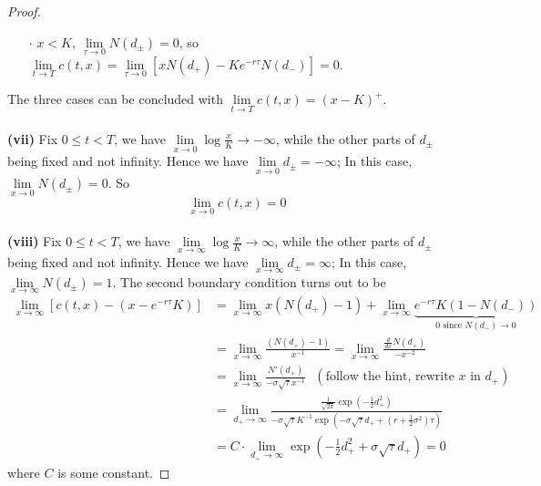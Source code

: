 \documentclass[a4paper, 10pt]{article}
\theoremstyle{definition}
\theoremstyle{hSol}
\begin{document}
\begin{proof}
\begin{itemize}
	\item[$\cdot$]  $x<K$, $\lim\limits_{\tau\rightarrow 0}N(d_{\pm}) = 0$, so $\lim\limits_{t\rightarrow T} c(t,x) = \lim\limits_{\tau \rightarrow 0} [xN(d_+)-Ke^{-r\tau}N(d_-)] =0$.
\end{itemize}
The three cases can be concluded with $\lim\limits_{t \rightarrow T} c(t,x) = (x-K)^+$.\\
~\\
\textbf{(vii)} Fix $0\leq t <T$, we have $\lim\limits_{x\rightarrow 0} \log \frac{x}{K}\to -\infty$, while the other parts of $d_{\pm}$ being fixed and not infinity. Hence we have $\lim\limits_{x\rightarrow 0} d_{\pm} = -\infty$; In this case, $\lim\limits_{x\rightarrow 0}N(d_{\pm})=0$. So
$$
\lim\limits_{x\rightarrow 0} c(t,x) = 0
$$
~\\
\textbf{(viii)} Fix $0\leq t <T$, we have $\lim\limits_{x\rightarrow \infty} \log \frac{x}{K}\to \infty$, while the other parts of $d_{\pm}$ being fixed and not infinity. Hence we have $\lim\limits_{x\rightarrow \infty} d_{\pm} = \infty$; In this case, $\lim\limits_{x\rightarrow \infty}N(d_{\pm})=1$. The second boundary condition turns out to be
\begin{equation}
	\begin{split}
		\lim\limits_{x\rightarrow\infty} [c(t,x) - (x-e^{-r\tau}K)] &= \lim\limits_{x\rightarrow\infty} x(N(d_+)-1) + \lim\limits_{x\rightarrow\infty} \underbrace{e^{-r\tau}K(1-N(d_-))}_{\text{0 since } N(d_-)\to 0} \\
		&=\lim\limits_{x\rightarrow\infty} \frac{(N(d_+)-1)}{x^{-1}} =\lim\limits_{x\rightarrow\infty} \frac{\frac{d}{d x} N(d_+)}{ -x^{-2}} \\
		&= \lim\limits_{x\rightarrow\infty} \frac{N'(d_+)}{ -\sigma \sqrt{\tau} x^{-1}}~~~(\text{follow the hint, rewrite $x$ in }d_+) \\
		&= \lim\limits_{d_+\rightarrow\infty} \frac{\frac{1}{\sqrt{2\pi}}\exp(-\frac{1}{2}d_+^2)}{ -\sigma \sqrt{\tau}K^{-1}\exp(-\sigma \sqrt{\tau} d_+ + (r+\frac{1}{2}\sigma^2)\tau)} \\
		&= C \cdot \lim\limits_{d_+\rightarrow\infty} \exp \left(	-\frac{1}{2}d_+^2+\sigma\sqrt{\tau}d_+\right) = 0
	\end{split}
\end{equation}
where $C$ is some constant.

\end{proof}
\end{document}
